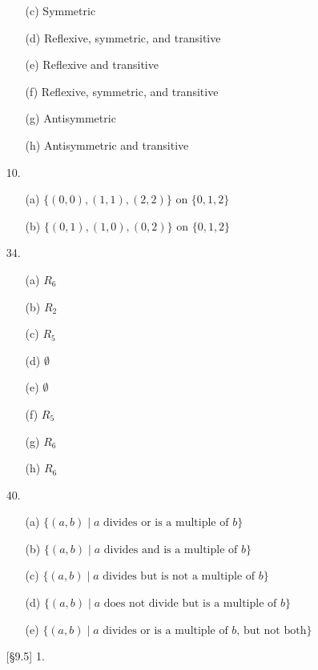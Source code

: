\documentclass{article}
\begin{document}
\begin{enumerate}
\begin{itemize}
            \item[(c)] Symmetric
            \item[(d)] Reflexive, symmetric, and transitive
            \item[(e)] Reflexive and transitive
            \item[(f)] Reflexive, symmetric, and transitive
            \item[(g)] Antisymmetric
            \item[(h)] Antisymmetric and transitive
        \end{itemize}
    \item[10.]
        \begin{itemize}
            \item[(a)] $\{ (0,0), (1,1), (2,2) \}$ on $\{ 0,1,2 \}$
            \item[(b)] $\{ (0,1), (1,0), (0,2) \}$ on $\{ 0,1,2 \}$
        \end{itemize}
    \item[34.]
        \begin{itemize}
            \item[(a)] $R_6$
            \item[(b)] $R_2$
            \item[(c)] $R_5$
            \item[(d)] $\emptyset$
            \item[(e)] $\emptyset$
            \item[(f)] $R_5$
            \item[(g)] $R_6$
            \item[(h)] $R_6$
        \end{itemize}
    \item[40.]
        \begin{itemize}
            \item[(a)] $\{ (a,b) \mid a \text{ divides or is a multiple of } b \}$
            \item[(b)] $\{ (a,b) \mid a \text{ divides and is a multiple of } b \}$
            \item[(c)] $\{ (a,b) \mid a \text{ divides but is not a multiple of } b \}$
            \item[(d)] $\{ (a,b) \mid a \text{ does not divide but is a multiple of } b \}$
            \item[(e)] $\{ (a,b) \mid a \text{ divides or is a multiple of } b \text{, but not both} \}$
        \end{itemize}
    \item[{[\S 9.5]} 1.]

\end{enumerate}
\end{document}
